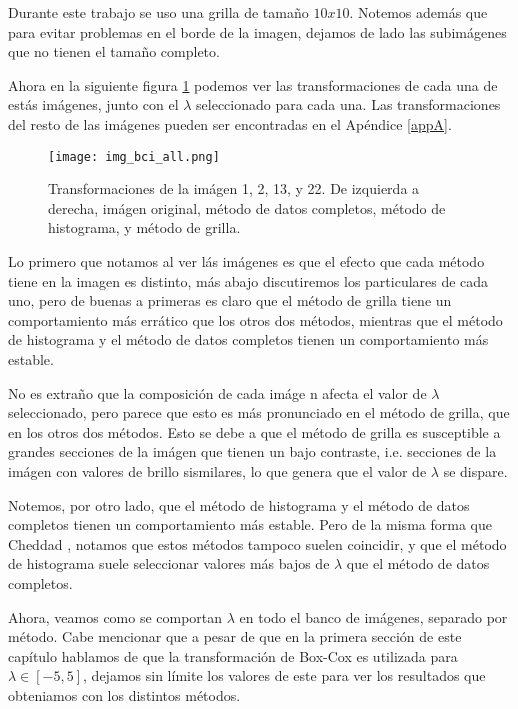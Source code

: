         Durante este trabajo se uso una grilla de tama\~no $10x10$. Notemos adem\'as que para evitar problemas en el borde de la imagen, dejamos de lado las subim\'agenes que no tienen el tama\~no completo.

    Ahora en la siguiente figura \ref{fig:img_bci_all} podemos ver las transformaciones de cada una de est\'as im\'agenes, junto con el $\lambda$ seleccionado para cada una. Las transformaciones del resto de las im\'agenes pueden ser encontradas en el Ap\'endice \ref{appA}.


    \begin{figure}[H]
        \centering
        \texttt{[image: img\_bci\_all.png]}
        \caption{Transformaciones de la im\'agen 1, 2, 13, y 22. De izquierda a derecha, im\'agen original, m\'etodo de datos completos, m\'etodo de histograma, y m\'etodo de grilla.}
        \label{fig:img_bci_all}
    \end{figure}


    Lo primero que notamos al ver l\'as im\'agenes es que el efecto que cada m\'etodo tiene en la imagen es distinto, m\'as abajo discutiremos los particulares de cada uno, pero de buenas a primeras es claro que el m\'etodo de grilla tiene un comportamiento m\'as err\'atico que los otros dos m\'etodos, mientras que el m\'etodo de histograma y el m\'etodo de datos completos tienen un comportamiento m\'as estable.

    No es extra\~no que la composici\'on de cada im\'age    n afecta el valor de $\lambda$ seleccionado, pero parece que esto es m\'as pronunciado en el m\'etodo de grilla, que en los otros dos m\'etodos. Esto se debe a que el m\'etodo de grilla es susceptible a grandes secciones de la im\'agen que tienen un bajo contraste, i.e. secciones de la im\'agen con valores de brillo sismilares, lo que genera que el valor de $\lambda$ se dispare. 

    Notemos, por otro lado, que el m\'etodo de histograma y el m\'etodo de datos completos tienen un comportamiento m\'as estable. Pero de la misma forma que Cheddad \cite{boxcoximg}, notamos que estos m\'etodos tampoco suelen coincidir, y que el m\'etodo de histograma suele seleccionar valores m\'as bajos de $\lambda$ que el m\'etodo de datos completos.
    
    Ahora, veamos como se comportan $\lambda$ en todo el banco de im\'agenes, separado por m\'etodo. Cabe mencionar que a pesar de que  en la primera secci\'on de este cap\'itulo hablamos de que la transformaci\'on de Box-Cox es utilizada para $\lambda\in[-5,5]$, dejamos sin l\'imite los valores de este para ver los resultados que obteniamos con los distintos m\'etodos.

